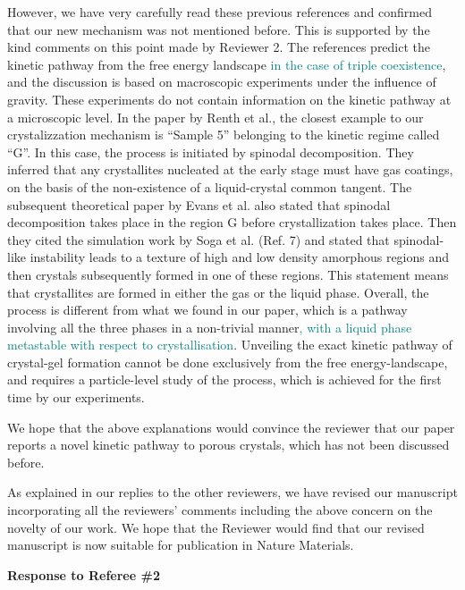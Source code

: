 \documentclass[11pt,a4paper]{article}
\begin{document}
However, we have very carefully read these previous references and confirmed that our new mechanism was not mentioned before. This is supported by the kind comments on this point made by Reviewer 2. The references predict the kinetic pathway from the free energy landscape \textcolor{teal}{in the case of triple coexistence}, and the discussion
is based on macroscopic experiments under the influence of gravity. These experiments do not contain information on the kinetic pathway at a microscopic level.
In the paper by Renth et al., the closest example to our crystalizzation mechanism is ``Sample 5'' belonging to the kinetic regime called ``G''. In this case, the process is initiated by spinodal decomposition. They inferred that any crystallites nucleated at the early stage must have gas coatings, on the basis of the non-existence of a liquid-crystal common tangent. The subsequent theoretical paper by Evans et al. also stated that spinodal decomposition takes place in the region G before crystallization takes place. Then they cited the simulation work by Soga et al. (Ref. 7) and 
stated that spinodal-like instability leads to a texture of high and low density amorphous regions and then crystals subsequently formed in one of these regions. This statement means that crystallites are formed in either the gas or the liquid phase. Overall, the process is different from what we found in our paper, which is a pathway involving all the three phases in a non-trivial manner\textcolor{teal}{, with a liquid phase metastable with respect to crystallisation}. Unveiling the exact kinetic pathway of crystal-gel formation cannot
be done exclusively from the free energy-landscape, and requires a particle-level study of the process, which is achieved for the first time by our experiments.

We hope that the above explanations would convince the reviewer that our paper reports a novel kinetic pathway to porous crystals, which has not been discussed before. 

As explained in our replies to the other reviewers, we have revised our manuscript incorporating all the reviewers’ comments including the above concern on the novelty of our work. We hope that the Reviewer would find that our revised manuscript is now suitable for publication in Nature Materials. 


\clearpage

\noindent
\begin{Large}
{\bf Response to Referee \#2}
\end{Large}
\end{document}
